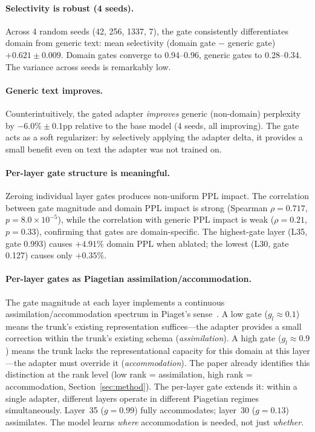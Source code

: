 \documentclass{article}
\begin{document}
\paragraph{Selectivity is robust (4 seeds).}
Across 4 random seeds (42, 256, 1337, 7), the gate consistently differentiates
domain from generic text: mean selectivity (domain gate $-$ generic gate)
$+0.621 \pm 0.009$. Domain gates converge to 0.94--0.96, generic gates to
0.28--0.34. The variance across seeds is remarkably low.

\paragraph{Generic text improves.}
Counterintuitively, the gated adapter \emph{improves} generic (non-domain)
perplexity by $-6.0\% \pm 0.1\text{pp}$ relative to the base model (4 seeds,
all improving). The gate acts as a soft regularizer: by selectively applying
the adapter delta, it provides a small benefit even on text the adapter was not
trained on.

\paragraph{Per-layer gate structure is meaningful.}
Zeroing individual layer gates produces non-uniform PPL impact. The correlation
between gate magnitude and domain PPL impact is strong (Spearman $\rho = 0.717$,
$p = 8.0 \times 10^{-5}$), while the correlation with generic PPL impact is
weak ($\rho = 0.21$, $p = 0.33$), confirming that gates are domain-specific.
The highest-gate layer (L35, gate 0.993) causes $+4.91\%$ domain PPL when
ablated; the lowest (L30, gate 0.127) causes only $+0.35\%$.

\paragraph{Per-layer gates as Piagetian assimilation/accommodation.}
The gate magnitude at each layer implements a continuous
assimilation/accommodation spectrum in Piaget's
sense~\cite{piaget1952}. A low gate ($g_l \approx 0.1$) means the
trunk's existing representation suffices---the adapter provides a
small correction within the trunk's existing schema
(\emph{assimilation}). A high gate ($g_l \approx 0.9$) means the trunk
lacks the representational capacity for this domain at this layer---the
adapter must override it (\emph{accommodation}). The paper already
identifies this distinction at the rank level (low rank = assimilation,
high rank = accommodation, Section~\ref{sec:method}). The per-layer
gate extends it: within a single adapter, different layers operate in
different Piagetian regimes simultaneously. Layer~35 ($g = 0.99$) fully
accommodates; layer~30 ($g = 0.13$) assimilates. The model learns
\emph{where} accommodation is needed, not just \emph{whether}.
\end{document}
